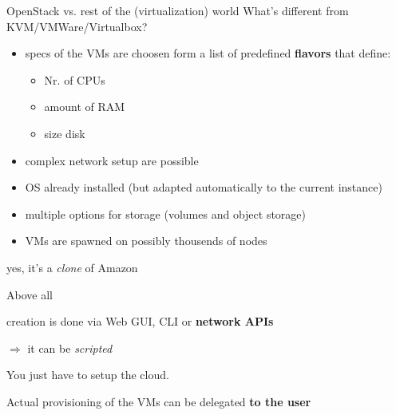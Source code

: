 \documentclass[english,serif,mathserif,usenames,dvipsnames]{beamer}
\begin{document}

\begin{frame}
  {OpenStack vs. rest of the (virtualization) world}
  What's different from KVM/VMWare/Virtualbox?

  \begin{itemize}
    \pause
  \item specs of the VMs are choosen form a list of predefined
    \textbf{flavors} that define:
    \begin{itemize}
    \item Nr. of CPUs
    \item amount of RAM
    \item size disk
    \end{itemize}

    \pause
  \item complex network setup are possible

    \pause
  \item OS already installed (but adapted automatically to the current
    instance)

    \pause
  \item multiple options for storage (volumes and object storage)

    \pause
  \item VMs are spawned on possibly thousends of nodes

  \end{itemize}

\pause\scriptsize
    yes, it's a \textit{clone} of Amazon
\end{frame}

\begin{frame}
  {Above all}

  creation is done via Web GUI, CLI or \textbf{network APIs}

  $\Rightarrow$ it can be \textit{scripted}

  \+
  \pause
  You just have to setup the cloud.

  \+
  Actual provisioning of the VMs can be delegated \textbf{to
    the user}


\end{frame}
\end{document}
